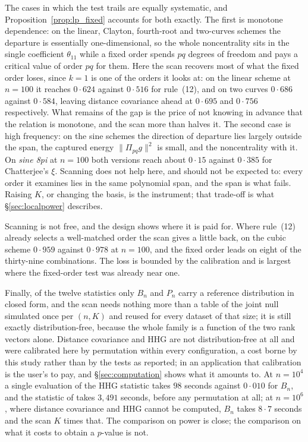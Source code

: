 The cases in which the test trails are equally systematic, and
Proposition~\ref{prop:lp_fixed} accounts for both exactly. The first is monotone
dependence: on the linear, Clayton, fourth-root and two-curves schemes the
departure is essentially one-dimensional, so the whole noncentrality sits in the
single coefficient $\theta_{11}$ while a fixed order spends $pq$ degrees of
freedom and pays a critical value of order $pq$ for them. Here the scan recovers
most of what the fixed order loses, since $k = 1$ is one of the orders it looks
at: on the linear scheme at $n = 100$ it reaches $0{\cdot}624$ against
$0{\cdot}516$ for rule~(12), and on two curves $0{\cdot}686$ against
$0{\cdot}584$, leaving distance covariance ahead at $0{\cdot}695$ and
$0{\cdot}756$ respectively. What remains of the gap is the price of not knowing
in advance that the relation is monotone, and the scan more than halves it. The
second case is high frequency: on the sine schemes the direction of departure
lies largely outside the span, the captured energy $\|\Pi_{pq}g\|^2$ is small,
and the noncentrality with it. On \textit{sine 8pi} at $n = 100$ both versions
reach about $0{\cdot}15$ against $0{\cdot}385$ for Chatterjee's $\xi$. Scanning
does not help here, and should not be expected to: every order it examines lies
in the same polynomial span, and the span is what fails. Raising $K$, or
changing the basis, is the instrument; that trade-off is what
\S\ref{sec:localpower} describes.

Scanning is not free, and the design shows where it is paid for. Where rule~(12)
already selects a well-matched order the scan gives a little back, on the cubic
scheme $0{\cdot}959$ against $0{\cdot}978$ at $n = 100$, and the fixed order
leads on eight of the thirty-nine combinations. The loss is bounded by the
calibration and is largest where the fixed-order test was already near one.

Finally, of the twelve statistics only $B_n$ and $P_n$ carry a reference
distribution in closed form, and the scan needs nothing more than a table of the
joint null simulated once per $(n, K)$ and reused for every dataset of that
size; it is still exactly distribution-free, because the whole family is a
function of the two rank vectors alone. Distance covariance and HHG are not
distribution-free at all and were calibrated here by permutation within every
configuration, a cost borne by this study rather than by the tests as reported;
in an application that calibration is the user's to pay, and
\S\ref{sec:computation} shows what it amounts to. At $n = 10^4$ a single
evaluation of the HHG statistic takes $98$ seconds against $0{\cdot}010$ for
$B_n$, and the statistic of \citet{Gen19} takes $3{,}491$ seconds, before any
permutation at all; at $n = 10^6$, where distance covariance and HHG cannot be
computed, $B_n$ takes $8{\cdot}7$ seconds and the scan $K$ times that. The
comparison on power is close; the comparison on what it costs to obtain a
$p$-value is not.
